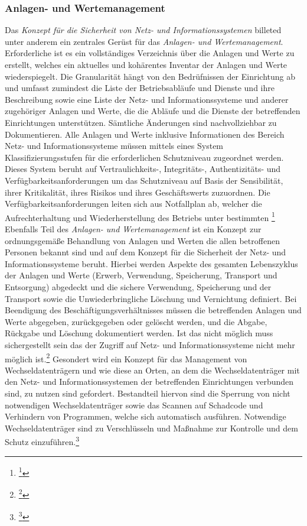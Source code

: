 \documentclass[11pt,a4paper,hidelinks]{article}   %
\begin{document}
            \subsubsection{Anlagen- und Wertemanagement}
            Das \emph{Konzept für die Sicherheit von Netz- und Informationssystemen} billeted unter anderem ein zentrales Gerüst für das \emph{Anlagen- und Wertemanagement}. Erforderliche ist es ein vollständiges Verzeichnis über die Anlagen und Werte zu erstellt, welches ein aktuelles und kohärentes Inventar der Anlagen und Werte wiederspiegelt. Die Granularität hängt von den Bedrüfnissen der Einrichtung ab und umfasst zumindest die Liste der Betriebsabläufe und Dienste und ihre Beschreibung sowie eine Liste der Netz- und Informationssysteme und anderer zugehöriger Anlagen und Werte, die die Abläufe und die Dienste der betreffenden Einrichtungen unterstützen. Sämtliche Änderungen sind nachvollziehbar zu Dokumentieren. Alle Anlagen und Werte inklusive Informationen des Bereich Netz- und Informationssysteme müssen mittels eines System Klassifizierungsstufen für die erforderlichen Schutzniveau zugeordnet werden. Dieses System beruht auf Vertraulichkeits-, Integritäts-, Authentizitäts- und Verfügbarkeitsanforderungen um das Schutzniveau auf Basis der Sensibilität, ihrer Kritikalität, ihres Risikos und ihres Geschäftswerts zuzuordnen. Die Verfügbarkeitsanforderungen leiten sich aus Notfallplan ab, welcher die Aufrechterhaltung und Wiederherstellung des Betriebs unter bestimmten \footnote{\footcite[Vgl.][, Anhang, Nummer 12.1.1., 12.1.2., 12.4.1., 12.4.2. \& 12.4.3.]{EU2024-2690}} Ebenfalls Teil des \emph{Anlagen- und Wertemanagement} ist ein Konzept zur ordnungsgemäße Behandlung von Anlagen und Werten die allen betroffenen Personen bekannt sind und auf dem Konzept für die Sicherheit der Netz- und Informationssysteme beruht. Hierbei werden Aspekte des gesamten Lebenszyklus der Anlagen und Werte (Erwerb, Verwendung, Speicherung, Transport und Entsorgung) abgedeckt und die sichere Verwendung, Speicherung und der Transport sowie die Unwiederbringliche Löschung und Vernichtung definiert. Bei Beendigung des Beschäftigungsverhältnisses müssen die betreffenden Anlagen und Werte abgegeben, zurückgegeben oder gelöscht werden, und die Abgabe, Rückgabe und Löschung dokumentiert werden. Ist das nicht möglich muss sichergestellt sein das der Zugriff auf Netz- und Informationssysteme nicht mehr möglich ist.\footnote{\footcite[Vgl.][, Anhang, Nummer 12.2.1., 12.2.2., \& 12.4.5.]{EU2024-2690}} Gesondert wird ein Konzept für das Management von Wechseldatenträgern und wie diese an Orten, an dem die Wechseldatenträger mit den Netz- und Informationssystemen der betreffenden Einrichtungen verbunden sind, zu nutzen sind gefordert. Bestandteil hiervon sind die Sperrung von nicht notwendigen Wechseldatenträger sowie das Scannen auf Schadcode und Verhindern von Programmen, welche sich automatisch ausführen. Notwendige Wechseldatenträger sind zu Verschlüsseln und Maßnahme zur Kontrolle und dem Schutz einzuführen.\footnote{\footcite[Vgl.][, Anhang, Nummer 12.3.1., \& 12.3.2.]{EU2024-2690}}
\end{document}

